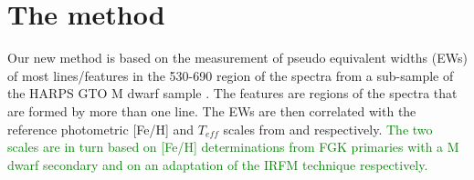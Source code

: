 \documentclass{aa}
\begin{document}








\section{The method}
\label{sec:calib}

Our new method is based on the measurement of pseudo equivalent widths (EWs) of most lines/features in the 530-690 region of the spectra from a sub-sample of the HARPS GTO M dwarf sample \citep{Bonfils-2013}. The features are regions of the spectra that are formed by more than one line. The EWs are then correlated with the reference photometric [Fe/H] and $T_{eff}$ scales from \citet{Neves-2012} and \citet{Casagrande-2008} respectively. \textcolor{green}{The two scales are in turn based on [Fe/H] determinations from FGK primaries with a M dwarf secondary and on an adaptation of the IRFM technique \citep{Blackwell-1977} respectively.}
\end{document}

